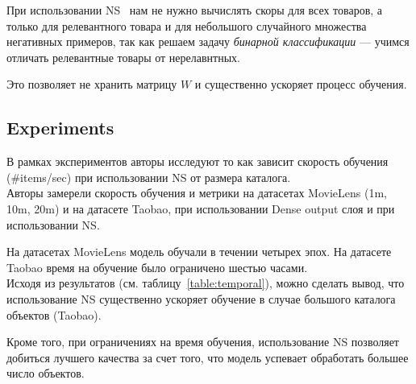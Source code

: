 При использовании NS~\cite{mikolov2013distributed} нам не нужно вычислять скоры для всех товаров, а только для релевантного товара и для небольшого случайного множества негативных примеров, так как решаем задачу \textit{бинарной классификации} --- учимся отличать релевантные товары от нерелавнтных.

Это позволяет не хранить матрицу $W$ и существенно ускоряет процесс обучения.

\subsection{Experiments}

В рамках экспериментов авторы исследуют то как зависит скорость обучения (\#items/sec) при использовании NS от размера каталога. \\

Авторы замерели скорость обучения и метрики на датасетах MovieLens (1m, 10m, 20m) и на датасете Taobao, при использовании Dense output слоя и при использовании NS.

На датасетах MovieLens модель обучали в течении четырех эпох. На датасете Taobao время на обучение было ограничено шестью часами. \\

Исходя из результатов (см. таблицу~\ref{table:temporal}), можно сделать вывод, что использование NS существенно ускоряет обучение в случае большого каталога объектов (Taobao).

Кроме того, при ограничениях на время обучения, использование NS позволяет добиться лучшего качества за счет того, что модель успевает обработать большее число объектов. 

